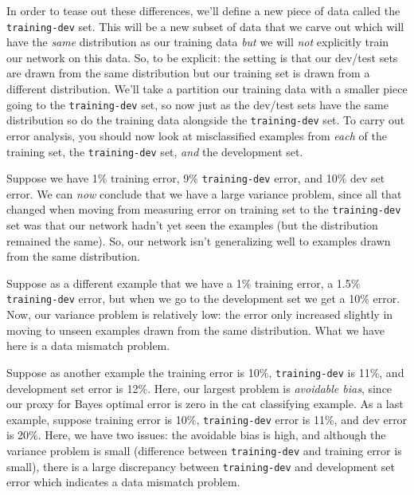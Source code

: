 \documentclass[12pt]{article}
\begin{document}
In order to tease out these differences, we'll define a new piece of data called the \texttt{training-dev} set. This will be a new
subset of data that we carve out which will have the \emph{same} distribution as our training data \emph{but} we will \emph{not}
explicitly train our network on this data. So, to be explicit: the setting is that our dev/test sets are drawn from the same distribution but our training set is drawn from a different distribution. We'll take a partition our training data with a smaller piece 
going to the \texttt{training-dev} set, so now just as the dev/test sets have the same distribution so do the training data alongside the \texttt{training-dev} set. To carry out error analysis, you should now look at misclassified examples from \emph{each} of
the training set, the \texttt{training-dev} set, \emph{and} the development set.

Suppose we have 1\% training error, 9\% \texttt{training-dev} error, and 10\% dev set error. We can \emph{now} conclude that we have a large variance problem, since all that changed when moving from measuring error on training set to the \texttt{training-dev} set
was that our network hadn't yet seen the examples (but the distribution remained the same). So, our network isn't generalizing well
to examples drawn from the same distribution.

Suppose as a different example that we have a 1\% training error, a 1.5\% \texttt{training-dev} error, but when we go to the development set we get a 10\% error. Now, our variance problem is relatively low: the error only increased slightly in moving to unseen examples drawn from the same distribution. What we have here is a data mismatch problem.

Suppose as another example the training error is 10\%, \texttt{training-dev} is 11\%, and development set error is 12\%. Here, our largest problem is \emph{avoidable bias}, since our proxy for Bayes optimal error is zero in the cat classifying example. As a last example, suppose training error is 10\%, \texttt{training-dev} error is 11\%, and dev error is 20\%. Here, we have two issues: the avoidable bias is high, and although the variance problem is small (difference between \texttt{training-dev} and training error is small), there is a large discrepancy between \texttt{training-dev} and development set error which indicates a data mismatch problem.  
\end{document}
